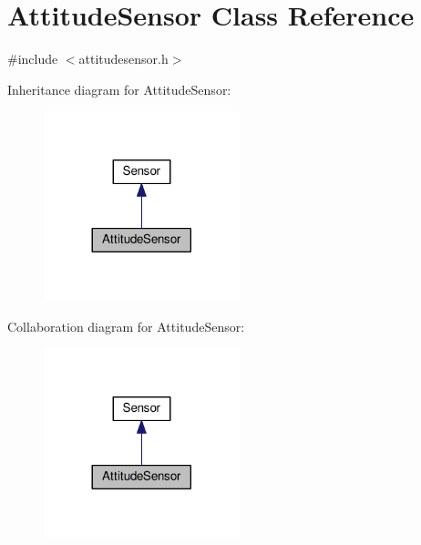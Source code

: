 \hypertarget{classAttitudeSensor}{}\section{Attitude\+Sensor Class Reference}
\label{classAttitudeSensor}


{\ttfamily \#include $<$attitudesensor.\+h$>$}



Inheritance diagram for Attitude\+Sensor\+:\nopagebreak
\begin{figure}[H]
\begin{center}
\leavevmode
\includegraphics[width=161pt]{classAttitudeSensor__inherit__graph}
\end{center}
\end{figure}


Collaboration diagram for Attitude\+Sensor\+:\nopagebreak
\begin{figure}[H]
\begin{center}
\leavevmode
\includegraphics[width=161pt]{classAttitudeSensor__coll__graph}
\end{center}
\end{figure}
